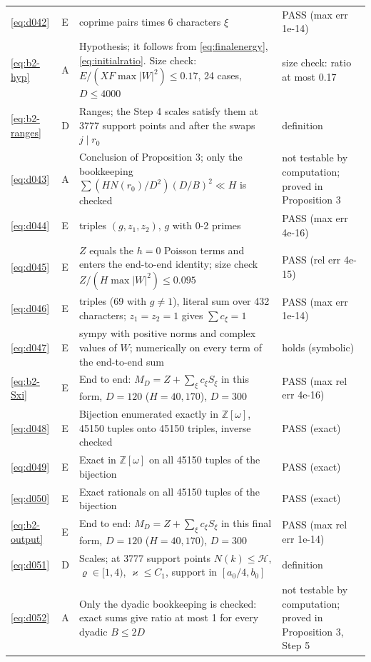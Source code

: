 \documentclass[11pt]{article}
\numberwithin{equation}{section}
\begin{document}
\begin{longtable}{@{}>{\raggedright\arraybackslash}p{1.2cm}>{\centering\arraybackslash}p{0.7cm}>{\raggedright\arraybackslash}p{9.05cm}>{\raggedright\arraybackslash}p{4.3cm}@{}}
\eqref{eq:d042} & E & 83 coprime pairs times 6 characters $\xi$ & PASS (max err 1e-14)\\
\eqref{eq:b2-hyp} & A & Hypothesis; it follows from \eqref{eq:finalenergy}, \eqref{eq:initialratio}. Size check: $E/(XF\max|W|^2)\le0.17$, 24 cases, $D\le4000$ & size check: ratio at most 0.17\\
\eqref{eq:b2-ranges} & D & Ranges; the Step 4 scales satisfy them at 3777 support points and after the swaps $j\mid r_0$ & definition\\
\eqref{eq:d043} & A & Conclusion of Proposition 3; only the bookkeeping $\sum(HN(r_0)/D^2)(D/B)^2\ll H$ is checked & not testable by computation; proved in Proposition 3\\
\eqref{eq:d044} & E & 72 triples $(g,z_1,z_2)$, $g$ with 0-2 primes & PASS (max err 4e-16)\\
\eqref{eq:d045} & E & $Z$ equals the $h=0$ Poisson terms and enters the end-to-end identity; size check $Z/(H\max|W|^2)\le0.095$ & PASS (rel err 4e-15)\\
\eqref{eq:d046} & E & 72 triples (69 with $g\ne1$), literal sum over 432 characters; $z_1=z_2=1$ gives $\sum c_\xi=1$ & PASS (max err 1e-14)\\
\eqref{eq:d047} & E & sympy with positive norms and complex values of $W$; numerically on every term of the end-to-end sum & holds (symbolic)\\
\eqref{eq:b2-Sxi} & E & End to end: $M_D=Z+\sum_\xi c_\xi S_\xi$ in this form, $D=120$ ($H=40,170$), $D=300$ & PASS (max rel err 4e-16)\\
\eqref{eq:d048} & E & Bijection enumerated exactly in $\mathbb Z[\omega]$, 45150 tuples onto 45150 triples, inverse checked & PASS (exact)\\
\eqref{eq:d049} & E & Exact in $\mathbb Z[\omega]$ on all 45150 tuples of the bijection & PASS (exact)\\
\eqref{eq:d050} & E & Exact rationals on all 45150 tuples of the bijection & PASS (exact)\\
\eqref{eq:b2-output} & E & End to end: $M_D=Z+\sum_\xi c_\xi S_\xi$ in this final form, $D=120$ ($H=40,170$), $D=300$ & PASS (max rel err 1e-14)\\
\eqref{eq:d051} & D & Scales; at 3777 support points $N(k)\le\mathcal H$, $\varrho\in[1,4)$, $\varkappa\le C_1$, support in $[a_0/4,b_0]$ & definition\\
\eqref{eq:d052} & A & Only the dyadic bookkeeping is checked: exact sums give ratio at most 1 for every dyadic $B\le2D$ & not testable by computation; proved in Proposition 3, Step 5\\

\end{longtable}
\end{document}
